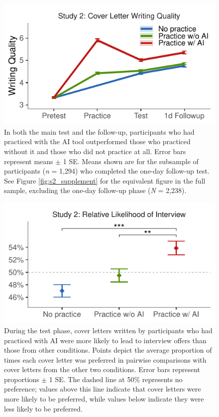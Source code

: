 \documentclass[11pt]{report}
\begin{document}
\begin{mainf}
\begin{figure}[t]
    \centering
    \includegraphics[width=1\linewidth]{mainfig.pdf}
    \caption{In both the main test and the follow-up, participants who had practiced with the AI tool outperformed those who practiced without it and those who did not practice at all.
    Error bars represent means $\pm$ 1 SE.
    Means shown are for the subsample of participants (\textit{n} = 1,294) who completed the one-day follow-up test. See Figure \ref{fig:s2_supplement} for the equivalent figure in the full sample, excluding the one-day follow-up phase (\textit{N} = 2,238).}
    \label{fig:difs}
\end{figure}

\begin{figure}[ht]
    \centering
    \includegraphics[width=1\linewidth]{ratings1.pdf}
    \caption{During the test phase, cover letters written by participants who had practiced with AI were more likely to lead to interview offers than those from other conditions. Points depict the average proportion of times each cover letter was preferred in pairwise comparisons with cover letters from the other two conditions. Error bars represent proportions $\pm$ 1 SE. The dashed line at 50\% represents no preference; values above this line indicate that cover letters were more likely to be preferred, while values below indicate they were less likely to be preferred.}
    \label{fig:ratings1}
\end{figure}


\end{mainf}
\end{document}
